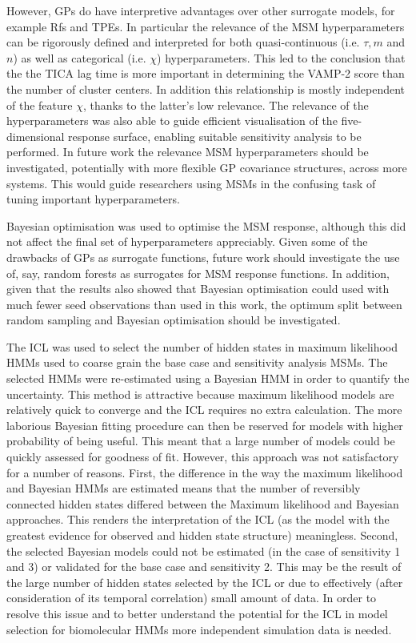 However, GPs do have interpretive advantages over other surrogate models, for example Rfs and TPEs. In particular the relevance of the MSM hyperparameters can be rigorously defined and interpreted for both quasi-continuous (i.e. $\tau, m$ and $n$) as well as categorical (i.e. $\chi$) hyperparameters. This led to the conclusion that the the TICA lag time is more important in determining the VAMP-2 score than the number of cluster centers. In addition this relationship is mostly independent of the feature $\chi$, thanks to the latter's low relevance. The relevance of the hyperparameters was also able to guide efficient visualisation of the five-dimensional response surface, enabling suitable sensitivity analysis to be performed. In future work the relevance MSM hyperparameters should be investigated, potentially with more flexible GP covariance structures, across more systems. This would guide researchers using MSMs in the confusing task of tuning important hyperparameters. 

Bayesian optimisation was used to optimise the MSM response, although this did not affect the final set of hyperparameters appreciably. Given some of the drawbacks of GPs as surrogate functions, future work should investigate the use of, say, random forests  as surrogates for MSM response functions. In addition, given that the results also showed that Bayesian optimisation could used with much fewer seed observations than used in this work, the optimum split between random sampling and Bayesian optimisation should be investigated.

The ICL was used to select the number of hidden states in maximum likelihood HMMs used to coarse grain the base case and sensitivity analysis MSMs. The selected HMMs were re-estimated using a Bayesian HMM in order to quantify the uncertainty. This method is attractive because maximum likelihood models are relatively quick to converge and the ICL requires no extra calculation. The more laborious Bayesian fitting procedure can then be reserved for models with higher probability of being useful. This meant that a large number of models could be quickly assessed for goodness of fit. However, this approach was not satisfactory for a number of reasons. First, the difference in the way the maximum likelihood and Bayesian HMMs are estimated means that the number of reversibly connected hidden states differed between the Maximum likelihood and Bayesian approaches. This renders the interpretation of the ICL (as the model with the greatest evidence for observed and hidden state structure) meaningless. Second, the selected Bayesian models could not be estimated (in the case of sensitivity 1 and 3) or validated for the base case and sensitivity 2. This may be the result of the large number of hidden states selected by the ICL or due to effectively (after consideration of its temporal correlation) small amount of data. In order to resolve this issue and to better understand the potential for the ICL in model selection for biomolecular HMMs more independent simulation data is needed. 


